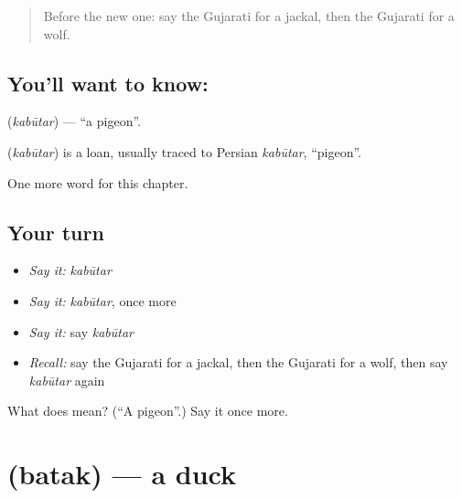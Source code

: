 \label{lesson:GU-C122-kabutar}



\begin{quote}
Before the new one: say the Gujarati for a jackal, then the Gujarati for a wolf.
\end{quote}

\subsection*{You'll want to know: }
\textbf{} (\emph{kabūtar}) — \textquotedblleft{}a pigeon\textquotedblright{}.

\begin{cousinweb}
\textbf{} (\emph{kabūtar}) is a loan, usually traced to Persian \emph{kabūtar}, \textquotedblleft{}pigeon\textquotedblright{}.
\end{cousinweb}

\begin{grammarlens}[title={What you've built}]
One more word for this chapter.
\end{grammarlens}

\subsection*{Your turn}
\begin{itemize}
\raggedright
  \item \emph{Say it:} \emph{kabūtar}
  \item \emph{Say it:} \emph{kabūtar}, once more
  \item \emph{Say it:} say \emph{kabūtar}
  \item \emph{Recall:} say the Gujarati for a jackal, then the Gujarati for a wolf, then say \emph{kabūtar} again
\end{itemize}

\begin{tcolorbox}[breakable,colback=teal!4,colframe=teal!35!black,title={Before you move on}]
What does  mean? (\textquotedblleft{}A pigeon\textquotedblright{}.) Say it once more.
\end{tcolorbox}
\section[\texorpdfstring{\gu{બતક} (batak)}{બતક (batak)}]{ (batak) — a duck}

\label{lesson:GU-C122-batak}



